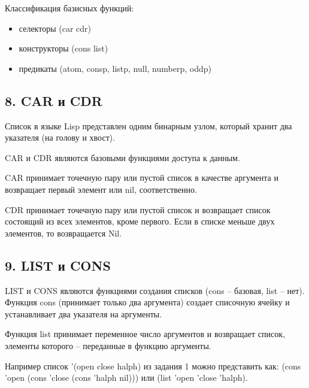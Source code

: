 Классификация базисных функций:
\begin{itemize}
	\item селекторы (car cdr)
	\item конструкторы (cons list)
	\item предикаты (atom, consp, listp, null, numberp, oddp)
\end{itemize}


\subsection*{8. CAR и CDR}

Список в языке Lisp представлен одним бинарным узлом, который хранит два указателя (на голову и хвост). 

CAR и CDR являются базовыми функциями доступа к данным. 

CAR принимает точечную пару или пустой список в качестве аргумента и возвращает первый элемент или nil, соответственно. 

CDR принимает точечную пару или пустой список и возвращает список состоящий из всех элементов, кроме первого. Если в списке меньше двух элементов, то возвращается Nil.


\subsection*{9. LIST и CONS}
LIST и CONS являются функциями создания списков (cons – базовая, list – нет).
Функция cons (принимает только два аргумента) создает списочную ячейку и устанавливает два указателя на аргументы. 

Функция list принимает переменное число аргументов и возвращает список, элементы которого – переданные в функцию аргументы.



Например список '(open close halph) из задания 1 можно представить как:
(cons 'open (cons 'close (cons 'halph nil))) 
или (list 'open 'close 'halph).






